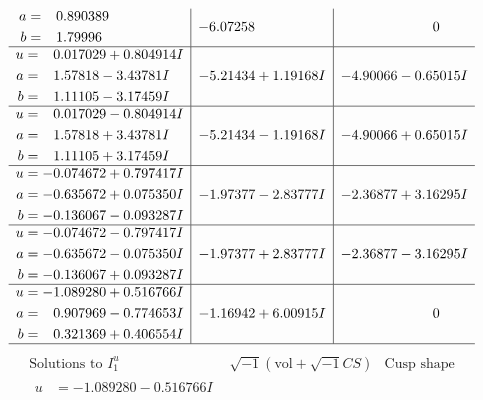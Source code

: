 \documentclass[1p]{elsarticle_modified}
\theoremstyle{definition}
\newcommand{\I}{\sqrt{-1}}
\begin{document}
$$\begin{array}{c|c|c}
\begin{aligned}
a &= \phantom{-}0.890389\phantom{ +0.000000I} \\
b &= \phantom{-}1.79996\phantom{ +0.000000I}\end{aligned}
 & -6.07258\phantom{ +0.000000I} & \phantom{-0.000000 } 0 \\ \hline\begin{aligned}
u &= \phantom{-}0.017029 + 0.804914 I \\
a &= \phantom{-}1.57818 - 3.43781 I \\
b &= \phantom{-}1.11105 - 3.17459 I\end{aligned}
 & -5.21434 + 1.19168 I & -4.90066 - 0.65015 I \\ \hline\begin{aligned}
u &= \phantom{-}0.017029 - 0.804914 I \\
a &= \phantom{-}1.57818 + 3.43781 I \\
b &= \phantom{-}1.11105 + 3.17459 I\end{aligned}
 & -5.21434 - 1.19168 I & -4.90066 + 0.65015 I \\ \hline\begin{aligned}
u &= -0.074672 + 0.797417 I \\
a &= -0.635672 + 0.075350 I \\
b &= -0.136067 - 0.093287 I\end{aligned}
 & -1.97377 - 2.83777 I & -2.36877 + 3.16295 I \\ \hline\begin{aligned}
u &= -0.074672 - 0.797417 I \\
a &= -0.635672 - 0.075350 I \\
b &= -0.136067 + 0.093287 I\end{aligned}
 & -1.97377 + 2.83777 I & -2.36877 - 3.16295 I \\ \hline\begin{aligned}
u &= -1.089280 + 0.516766 I \\
a &= \phantom{-}0.907969 - 0.774653 I \\
b &= \phantom{-}0.321369 + 0.406554 I\end{aligned}
 & -1.16942 + 6.00915 I & \phantom{-0.000000 } 0\\
 \hline 
 \end{array}$$\newpage$$\begin{array}{c|c|c}  
\text{Solutions to }I^u_{1}& \I (\text{vol} + \sqrt{-1}CS) & \text{Cusp shape}\\
 \hline 
\begin{aligned}
u &= -1.089280 - 0.516766 I \\

\end{aligned}
\end{array}$$
\end{document}
